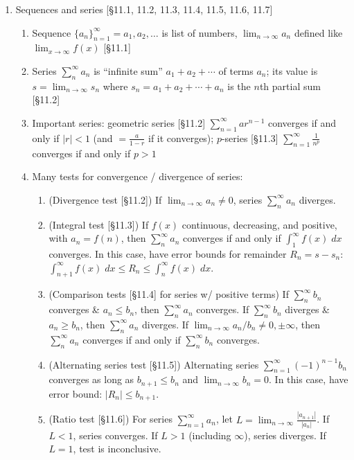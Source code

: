 \documentclass[11pt]{article}
\begin{document}
\begin{enumerate}
\item Sequences and series [\S11.1, 11.2, 11.3, 11.4, 11.5, 11.6, 11.7]
\begin{enumerate}
\item Sequence $\{a_n\}_{n=1}^{\infty} = a_1,a_2,\ldots$ is list of numbers, $\displaystyle \lim_{n\to \infty} a_n$ defined like $\displaystyle \lim_{x \to \infty} f(x)$ [\S11.1]
\item Series $\sum_{n}^{\infty} a_n$ is ``infinite sum'' $a_1+a_2+\cdots$ of terms $a_n$; its value is $s=\lim_{n\to\infty} s_n$ where $s_n = a_1+a_2+\cdots+a_n$ is the $n$th partial sum [\S11.2]
\item Important series: geometric series [\S11.2] $\sum_{n=1}^{\infty} ar^{n-1}$ converges if and only if $|r|<1$ (and $=\frac{a}{1-r}$ if it converges); $p$-series [\S11.3] $\sum_{n=1}^{\infty}\frac{1}{n^p}$ converges if and only if $p > 1$ 
\item Many tests for convergence / divergence of series:
\begin{enumerate}
\item (Divergence test [\S11.2]) If $\lim_{n\to \infty} a_n \neq 0$, series $\sum_{n}^{\infty} a_n$ diverges.
\item (Integral test [\S11.3]) If $f(x)$ continuous, decreasing, and positive, with $a_n = f(n)$, then $\sum_{n}^{\infty} a_n$ converges if and only if $\int_{1}^{\infty} f(x) \; dx$ converges. In this case, have error bounds for remainder $R_n = s-s_n$: $\int_{n+1}^{\infty} f(x) \; dx \leq R_n \leq \int_{n}^{\infty} f(x) \; dx$.
\item (Comparison tests [\S11.4] for series w/ positive terms) If $\sum_{n}^{\infty} b_n$ converges \& $a_n \leq b_n$, then $\sum_{n}^{\infty} a_n$ converges. If $\sum_{n}^{\infty} b_n$ diverges \& $a_n \geq b_n$, then $\sum_{n}^{\infty} a_n$ diverges. If $\lim_{n\to\infty} a_n/b_n \neq 0, \pm\infty$, then $\sum_{n}^{\infty} a_n$ converges if and only if $\sum_{n}^{\infty} b_n$ converges.
\item (Alternating series test [\S11.5]) Alternating series $\sum_{n=1}^{\infty} (-1)^{n-1} b_n$ converges as long as $b_{n+1} \leq b_n$ and $\lim_{n\to\infty} b_n=0$. In this case, have error bound: $|R_n| \leq b_{n+1}$.
\item (Ratio test [\S11.6]) For series $\sum_{n=1}^{\infty} a_n$, let $L = \lim_{n\to \infty} \frac{|a_{n+1}|}{|a_n|}$. If $L < 1$, series converges. If $L > 1$ (including $\infty$), series diverges. If $L=1$, test is inconclusive.
\end{enumerate}
\end{enumerate}


\end{enumerate}
\end{document}
